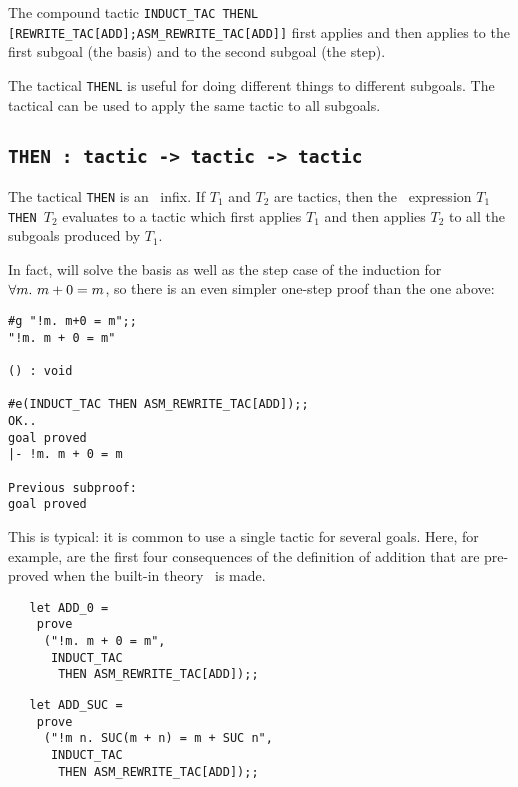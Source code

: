 \noindent The compound tactic
{\small\verb|INDUCT_TAC THENL [REWRITE_TAC[ADD];ASM_REWRITE_TAC[ADD]]|}
first applies  and then applies
 to the first subgoal (the basis) and
 to the second subgoal (the step).

The tactical {\small\verb|THENL|} is useful for doing different things to different
subgoals. The tactical  can be used to apply the same tactic to all
subgoals.

\subsection{\tt THEN : tactic -> tactic -> tactic}\label{THEN}


The tactical {\small\verb|THEN|} is an \ML\ infix. If $T_1$ and $T_2$ are tactics,
then the \ML\ expression $T_1${\small\verb| THEN |}$T_2$ evaluates to a tactic
which first applies $T_1$ and then applies $T_2$ to all the subgoals produced
by $T_1$.

In fact,
 will solve the basis as well as the step
case of the induction for $\forall m.\ m+0=m$, so there is an even
simpler one-step proof than the one above:
\setcounter{sessioncount}{1}
\begin{session}\begin{verbatim}
#g "!m. m+0 = m";;
"!m. m + 0 = m"

() : void

#e(INDUCT_TAC THEN ASM_REWRITE_TAC[ADD]);;
OK..
goal proved
|- !m. m + 0 = m

Previous subproof:
goal proved
\end{verbatim}\end{session}

\noindent This is typical: it is common to use a single tactic for several
goals. Here, for example, are the first four consequences of the definition
 of addition that are pre-proved when the built-in theory
 \HOL\ is made.

\begin{hol}\begin{verbatim}
   let ADD_0 =
    prove
     ("!m. m + 0 = m",
      INDUCT_TAC
       THEN ASM_REWRITE_TAC[ADD]);;
\end{verbatim}\end{hol}

\begin{hol}\begin{verbatim}
   let ADD_SUC =
    prove
     ("!m n. SUC(m + n) = m + SUC n",
      INDUCT_TAC
       THEN ASM_REWRITE_TAC[ADD]);;
\end{verbatim}\end{hol}

